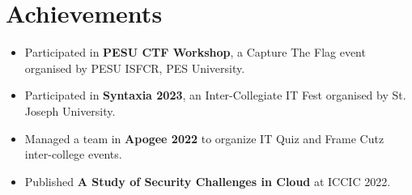 \documentclass[letterpaper,11pt]{article}
\newcommand{\resumePoint}[1]{
  \item\small{#1}
}
\newcommand{\resumeSubHeadingListStart}{\begin{itemize}[leftmargin=*, itemsep=3pt, parsep=0pt, topsep=2pt, partopsep=0pt]}
\newcommand{\resumeSubHeadingListEnd}{\end{itemize}}
\begin{document}
\section{Achievements}
  \resumeSubHeadingListStart
    \resumePoint{Participated in \textbf{PESU CTF Workshop}, a Capture The Flag event organised by PESU ISFCR, PES University.}
    \resumePoint{Participated in \textbf{Syntaxia 2023}, an Inter-Collegiate IT Fest organised by St. Joseph University.}
    \resumePoint{Managed a team in \textbf{Apogee 2022} to organize IT Quiz and Frame Cutz inter-college events.}
    \resumePoint{Published \textbf{A Study of Security Challenges in Cloud} at ICCIC 2022.}
  \resumeSubHeadingListEnd


\end{document}
